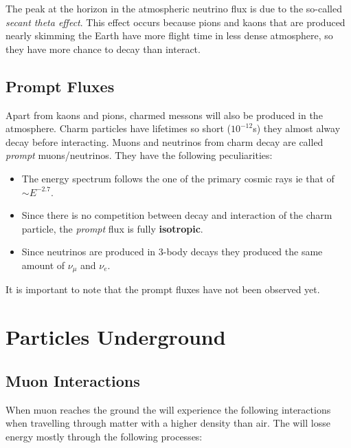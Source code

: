\documentclass[
  letterpaper,
  DIV=11,
  numbers=noendperiod]{scrreprt}
\providecommand{\tightlist}{%
  \setlength{\itemsep}{0pt}\setlength{\parskip}{0pt}}\usepackage{longtable,booktabs,array}
\begin{document}
The peak at the horizon in the atmospheric neutrino flux is due to the
so-called \emph{secant theta effect}. This effect occurs because pions
and kaons that are produced nearly skimming the Earth have more flight
time in less dense atmosphere, so they have more chance to decay than
interact.

\subsection*{Prompt Fluxes}\label{prompt-fluxes}

Apart from kaons and pions, charmed messons will also be produced in the
atmosphere. Charm particles have lifetimes so short (\(10^{-12}\)s) they
almost alway decay before interacting. Muons and neutrinos from charm
decay are called \emph{prompt} muons/neutrinos. They have the following
peculiarities:

\begin{itemize}
\tightlist
\item
  The energy spectrum follows the one of the primary cosmic rays ie that
  of \(\sim E^{-2.7}\).
\item
  Since there is no competition between decay and interaction of the
  charm particle, the \emph{prompt} flux is fully \textbf{isotropic}.
\item
  Since neutrinos are produced in 3-body decays they produced the same
  amount of \(\nu_\mu\) and \(\nu_e\).
\end{itemize}

It is important to note that the prompt fluxes have not been observed
yet.

\section*{Particles Underground}\label{particles-underground}


\subsection*{Muon Interactions}\label{muon-interactions}

When muon reaches the ground the will experience the following
interactions when travelling through matter with a higher density than
air. The will losse energy mostly through the following processes:
\end{document}
